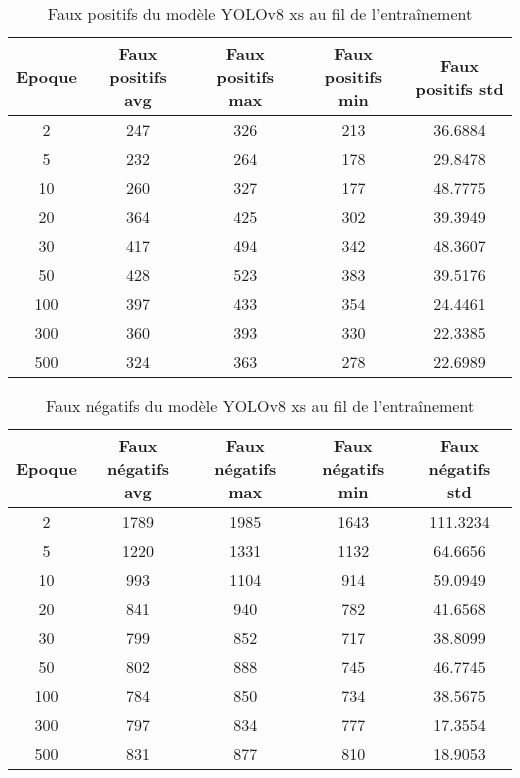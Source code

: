 \begin{table}[!ht]
    \caption{Faux positifs du modèle YOLOv8 xs au fil de l'entraînement}
    \label{tab:yolov8xs_false_positive}
    \centering
    \begin{tabular}{ |c||c|c|c|c|  }
        \hline
        \rowcolor{gray!50}
        Epoque & Faux positifs avg & Faux positifs max & Faux positifs min & Faux positifs std\\
        \hline
        2 & 247 & 326 & 213 & 36.6884\\
        5 & 232 & 264 & 178 & 29.8478\\
        10 & 260 & 327 & 177 & 48.7775\\
        20 & 364 & 425 & 302 & 39.3949\\
        30 & 417 & 494 & 342 & 48.3607\\
        50 & 428 & 523 & 383 & 39.5176\\
        100 & 397 & 433 & 354 & 24.4461\\
        300 & 360 & 393 & 330 & 22.3385\\
        500 & 324 & 363 & 278 & 22.6989\\
        \hline
    \end{tabular}
\end{table}

\begin{table}[!ht]
    \caption{Faux négatifs du modèle YOLOv8 xs au fil de l'entraînement}
    \label{tab:yolov8xs_false_negative}
    \centering
    \begin{tabular}{ |c||c|c|c|c|  }
        \hline
        \rowcolor{gray!50}
        Epoque & Faux négatifs avg & Faux négatifs max & Faux négatifs min & Faux négatifs std\\
        \hline
        2 & 1789 & 1985 & 1643 & 111.3234\\
        5 & 1220 & 1331 & 1132 & 64.6656\\
        10 & 993 & 1104 & 914 & 59.0949\\
        20 & 841 & 940 & 782 & 41.6568\\
        30 & 799 & 852 & 717 & 38.8099\\
        50 & 802 & 888 & 745 & 46.7745\\
        100 & 784 & 850 & 734 & 38.5675\\
        300 & 797 & 834 & 777 & 17.3554\\
        500 & 831 & 877 & 810 & 18.9053\\
        \hline
    \end{tabular}
\end{table}


